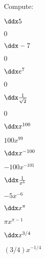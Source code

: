 \begin{exercises}

\noindent Compute:

\twocol


\begin{exercise} $\ddx 5$
\begin{answer} $0$
\end{answer}
\end{exercise}

\begin{exercise} $\ddx -7$
\begin{answer} $0$
\end{answer}
\end{exercise}

\begin{exercise} $\ddx e^7$
\begin{answer} $0$
\end{answer}
\end{exercise}

\begin{exercise} $\ddx \frac{1}{\sqrt{2}}$
\begin{answer} $0$
\end{answer}
\end{exercise}


\begin{exercise} $\ddx x^{100}$
\begin{answer} $100x^{99}$
\end{answer}
\end{exercise}

\begin{exercise} $\ddx x^{-100}$
\begin{answer} $-100x^{-101}$
\end{answer}\end{exercise}

\begin{exercise} $\ddx \frac{1}{x^5}$
\begin{answer} $-5x^{-6}$
\end{answer}\end{exercise}

\begin{exercise} $\ddx x^\pi$
\begin{answer} $\pi x^{\pi-1}$
\end{answer}\end{exercise}

\begin{exercise} $\ddx x^{3/4}$
\begin{answer} $(3/4)x^{-1/4}$
\end{answer}\end{exercise}


\end{exercises}
